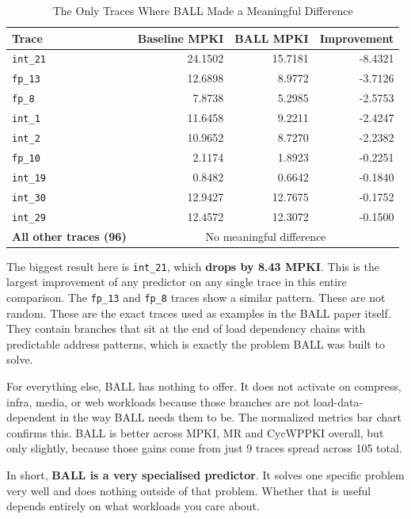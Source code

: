 \documentclass[11pt,a4paper]{article}
\begin{document}
\begin{table}[h]
\centering
\caption{The Only Traces Where BALL Made a Meaningful Difference}
\label{tab:ball_traces}
\begin{tabular}{lrrr}
\toprule
\textbf{Trace} & \textbf{Baseline MPKI} & \textbf{BALL MPKI} & 
\textbf{Improvement} \\
\midrule
\texttt{int\_21}  & 24.1502 & 15.7181 & -8.4321 \\
\texttt{fp\_13}   & 12.6898 &  8.9772 & -3.7126 \\
\texttt{fp\_8}    &  7.8738 &  5.2985 & -2.5753 \\
\texttt{int\_1}   & 11.6458 &  9.2211 & -2.4247 \\
\texttt{int\_2}   & 10.9652 &  8.7270 & -2.2382 \\
\texttt{fp\_10}   &  2.1174 &  1.8923 & -0.2251 \\
\texttt{int\_19}  &  0.8482 &  0.6642 & -0.1840 \\
\texttt{int\_30}  & 12.9427 & 12.7675 & -0.1752 \\
\texttt{int\_29}  & 12.4572 & 12.3072 & -0.1500 \\
\midrule
\textbf{All other traces (96)} & \multicolumn{3}{c}{No meaningful difference} \\
\bottomrule
\end{tabular}
\end{table}

The biggest result here is \texttt{int\_21}, which \textbf{drops by 8.43 MPKI}. This is
the largest improvement of any predictor on any single trace in this entire 
comparison. The \texttt{fp\_13} and \texttt{fp\_8} traces show a similar pattern. 
These are not random. These are the exact traces used as examples in the BALL 
paper itself. They contain branches that sit at the end of load dependency chains 
with predictable address patterns, which is exactly the problem BALL was built 
to solve.

For everything else, BALL has nothing to offer. It does not activate on compress, 
infra, media, or web workloads because those branches are not load-data-dependent 
in the way BALL needs them to be. The normalized metrics bar chart confirms this. 
BALL is better across MPKI, MR and CycWPPKI overall, but only slightly, because 
those gains come from just 9 traces spread across 105 total.

In short, \textbf{BALL is a very specialised predictor}. It solves one specific problem
very well and does nothing outside of that problem. Whether that is useful 
depends entirely on what workloads you care about.
\end{document}

